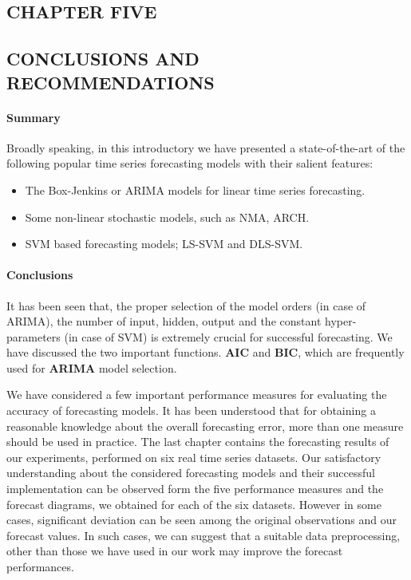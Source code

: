\documentclass[10pt]{report}
\begin{document}
\begin{flushleft}
		\chapter{CHAPTER  FIVE}
		\section{CONCLUSIONS AND RECOMMENDATIONS}
		\subsubsection{Summary}
			Broadly speaking, in this introductory we have presented a state-of-the-art of the following popular time series forecasting models with their salient features:
		\begin{itemize}
			\item  The Box-Jenkins or ARIMA models for linear time series forecasting. 
			\item Some non-linear stochastic models, such as NMA, ARCH. 
			\item SVM based forecasting models; LS-SVM and DLS-SVM.
		\end{itemize} 
		\subsubsection{ Conclusions}
		It has been seen that, the proper selection of the model orders (in case of ARIMA), the number of input, hidden, output  and the constant hyper-parameters (in case of SVM) is extremely crucial for successful forecasting. We have discussed the two important functions. \textbf{AIC} and \textbf{BIC}, which are frequently used for \textbf{ARIMA} model selection. 
	
		We have considered a few important performance measures for evaluating the accuracy of forecasting models. It has been understood that for obtaining a reasonable knowledge about the overall forecasting error, more than one measure should be used in practice. The last chapter contains the forecasting results of our experiments, performed on six real time series datasets. 
		Our satisfactory understanding about the considered forecasting models and their successful implementation can be observed form the five performance measures and the forecast diagrams, we obtained for each of the six datasets. However in some cases, significant deviation can be seen among the original observations and our forecast values. In such cases, we can suggest that a suitable data preprocessing, other than those we have used in our work may improve the forecast performances. 

\end{flushleft}
\end{document}
